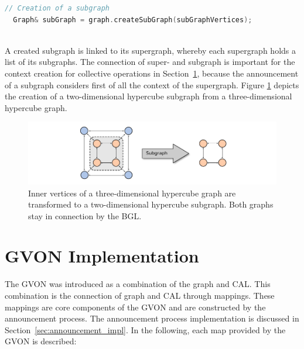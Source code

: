 \begin{minipage}[t]{\textwidth} 
\begin{lstlisting}[language=C++, label=lst:subgraph]
  // Creation of a subgraph
  Graph& subGraph = graph.createSubGraph(subGraphVertices);
  
\end{lstlisting}
\end{minipage}

\noindent A created subgraph is linked to its supergraph, whereby each
supergraph holds a list of its subgraphs. The connection of super- and
subgraph is important for the context creation for collective
operations in Section~\ref{sec:gvon_impl}, because the announcement of
a subgraph considers first of all the context of the
supergraph. Figure \ref{fig:subgraph_creation} depicts the creation of
a two-dimensional hypercube subgraph from a three-dimensional
hypercube graph.

\begin{figure}[H]
  \centering
  \includegraphics[width=\textwidth]{graphics/40_subgraph_creation}
  \caption{Inner vertices of a three-dimensional hypercube graph are 
  transformed to a two-dimensional hypercube subgraph. Both graphs
  stay in connection by the BGL.}
  \label{fig:subgraph_creation}
\end{figure}

\section{GVON Implementation}
\label{sec:gvon_impl}
The GVON was introduced as a combination
of the graph and CAL. This combination is the connection of graph and CAL
through mappings. These mappings are core components of the GVON and are
constructed by the announcement process. The announcement process
implementation is discussed in Section~\ref{sec:announcement_impl}. In
the following, each map provided by the GVON is described:

